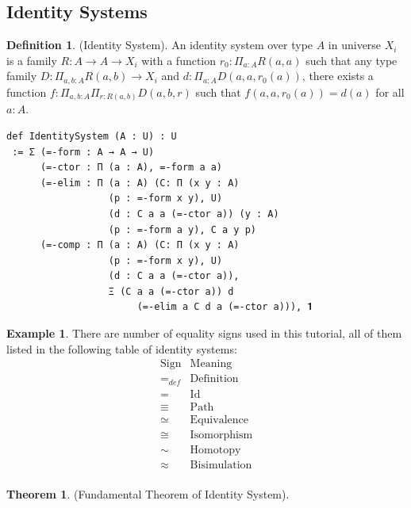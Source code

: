 \documentclass{article}
\theoremstyle{definition}
\newtheorem{definition}{Definition}
\newtheorem{theorem}{Theorem}
\newtheorem{example}{Example}
\begin{document}
\newpage
\subsection{Identity Systems}
\begin{definition} (Identity System).
An identity system over type $A$ in universe $X_i$ is a
family $R : A \rightarrow A \rightarrow X_i$ with a function
$r_0: \Pi_{a:A}R(a,a)$ such that any type family
$D : \Pi_{a,b:A}R(a,b) \rightarrow X_i$ and
$d: \Pi_{a:A}D(a,a,r_0(a))$, there exists a function
$f: \Pi_{a,b:A}\Pi_{r:R(a,b)}D(a,b,r)$ such that
$f(a,a,r_0(a))=d(a)$ for all $a:A$.
\begin{lstlisting}
def IdentitySystem (A : U) : U
 := Σ (=-form : A → A → U)
      (=-ctor : Π (a : A), =-form a a)
      (=-elim : Π (a : A) (C: Π (x y : A)
                  (p : =-form x y), U)
                  (d : C a a (=-ctor a)) (y : A)
                  (p : =-form a y), C a y p)
      (=-comp : Π (a : A) (C: Π (x y : A)
                  (p : =-form x y), U)
                  (d : C a a (=-ctor a)),
                  Ξ (C a a (=-ctor a)) d
                       (=-elim a C d a (=-ctor a))), 𝟏
\end{lstlisting}
\end{definition}

\begin{example}
There are number of equality signs used in this tutorial,
all of them listed in the following table of identity systems:
$$
\begin{array}{ll} \mathrm{Sign} & \mathrm{Meaning} \\
                         \hline
                        =_{def} & \mathrm{Definition} \\
                              = & \mathrm{Id} \\
                         \equiv & \mathrm{Path} \\
                         \simeq & \mathrm{Equivalence} \\
                          \cong & \mathrm{Isomorphism} \\
                           \sim & \mathrm{Homotopy} \\
                        \approx & \mathrm{Bisimulation} \\
                      \end{array}
$$
\end{example}

\begin{theorem} (Fundamental Theorem of Identity System).
\end{theorem}
\end{document}
